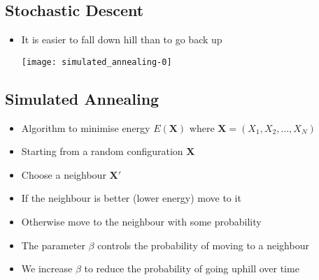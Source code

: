 
\begin{slide}
\section[-1]{Stochastic Descent}

\pb
\begin{itemize}
\item It is easier to fall down hill than to go back up\pause{}
  \begin{center}
    \texttt{[image: simulated\_annealing-0]}
  \end{center}
\end{itemize}

\end{slide}


\begin{slide}
\section[-1]{Simulated Annealing}

\begin{PauseHighLight}
  \begin{itemize}
  \item Algorithm to minimise energy $E(\bm{X})$ where
    $\bm{X}=(X_1,X_2,\ldots,X_N)$\pause
  \item Starting from a random configuration $\bm{X}$\pause
  \item Choose a neighbour $\bm{X}'$\pause
  \item If the neighbour is better (lower energy) move to it\pause
  \item Otherwise move to the neighbour with some probability\pause
  \item The parameter $\beta$ controls the probability of moving to a
    neighbour\pause
  \item We increase $\beta$ to reduce the probability of going uphill
    over time\pause
  \end{itemize}
\end{PauseHighLight}

\end{slide}

